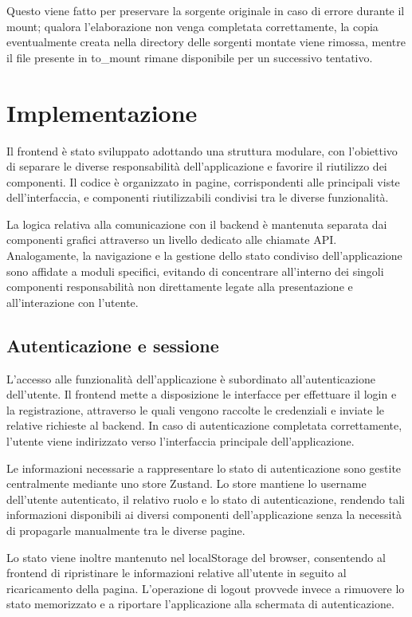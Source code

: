 \documentclass[13.6pt,a4paper]{report}
\begin{document}
\noindent
Questo viene fatto per preservare la sorgente originale in caso di errore durante il mount; qualora l'elaborazione non venga completata correttamente, la copia eventualmente creata nella directory delle sorgenti montate viene rimossa, mentre il file presente in to\_mount rimane disponibile per un successivo tentativo.


\chapter{Implementazione}

Il frontend è stato sviluppato adottando una struttura modulare, con l'obiettivo di separare le diverse responsabilità dell'applicazione e favorire il riutilizzo dei componenti. Il codice è organizzato in pagine, corrispondenti alle principali viste dell'interfaccia, e componenti riutilizzabili condivisi tra le diverse funzionalità.

\noindent
La logica relativa alla comunicazione con il backend è mantenuta separata dai componenti grafici attraverso un livello dedicato alle chiamate API. Analogamente, la navigazione e la gestione dello stato condiviso dell'applicazione sono affidate a moduli specifici, evitando di concentrare all'interno dei singoli componenti responsabilità non direttamente legate alla presentazione e all'interazione con l'utente.

\section{Autenticazione e sessione}
L'accesso alle funzionalità dell'applicazione è subordinato all'autenticazione dell'utente. Il frontend mette a disposizione le interfacce per effettuare il login e la registrazione, attraverso le quali vengono raccolte le credenziali e inviate le relative richieste al backend. In caso di autenticazione completata correttamente, l'utente viene indirizzato verso l'interfaccia principale dell'applicazione.

\noindent
Le informazioni necessarie a rappresentare lo stato di autenticazione sono gestite centralmente mediante uno store Zustand. Lo store mantiene lo username dell'utente autenticato, il relativo ruolo e lo stato di autenticazione, rendendo tali informazioni disponibili ai diversi componenti dell'applicazione senza la necessità di propagarle manualmente tra le diverse pagine.

\noindent
Lo stato viene inoltre mantenuto nel localStorage del browser, consentendo al frontend di ripristinare le informazioni relative all'utente in seguito al ricaricamento della pagina. L'operazione di logout provvede invece a rimuovere lo stato memorizzato e a riportare l'applicazione alla schermata di autenticazione.
\end{document}
